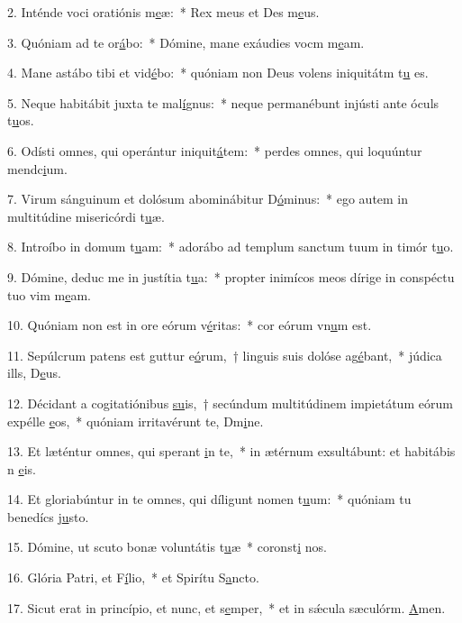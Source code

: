 2. Inténde voci oratiónis m\uline{e}æ:~* Rex meus et Des m\uline{e}us.\par 
3. Quóniam ad te or\uline{á}bo:~* Dómine, mane exáudies vocm m\uline{e}am.\par 
4. Mane astábo tibi et vid\uline{é}bo:~* quóniam non Deus volens iniquitátm t\uline{u} es.\par 
5. Neque habitábit juxta te mal\uline{í}gnus:~* neque permanébunt injústi ante óculs t\uline{u}os.\par 
6. Odísti omnes, qui operántur iniquit\uline{á}tem:~* perdes omnes, qui loquúntur mendc\uline{i}um.\par 
7. Virum sánguinum et dolósum abominábitur D\uline{ó}minus:~* ego autem in multitúdine misericórdi t\uline{u}æ.\par 
8. Introíbo in domum t\uline{u}am:~* adorábo ad templum sanctum tuum in timór t\uline{u}o.\par 
9. Dómine, deduc me in justítia t\uline{u}a:~* propter inimícos meos dírige in conspéctu tuo vim m\uline{e}am.\par 
10. Quóniam non est in ore eórum v\uline{é}ritas:~* cor eórum vn\uline{u}m est.\par 
11. Sepúlcrum patens est guttur e\uline{ó}rum,~† linguis suis dolóse ag\uline{é}bant,~* júdica ills, D\uline{e}us.\par 
12. Décidant a cogitatiónibus \uline{su}is,~† secúndum multitúdinem impietátum eórum expélle \uline{e}os,~* quóniam irritavérunt te, Dm\uline{i}ne.\par 
13. Et læténtur omnes, qui sperant \uline{i}n te,~* in ætérnum exsultábunt: et habitábis n \uline{e}is.\par 
14. Et gloriabúntur in te omnes, qui díligunt nomen t\uline{u}um:~* quóniam tu benedícs j\uline{u}sto.\par 
15. Dómine, ut scuto bonæ voluntátis t\uline{u}æ~* coronst\uline{i} nos.\par 
16. Glória Patri, et F\uline{í}lio,~* et Spirítu S\uline{a}ncto.\par 
17. Sicut erat in princípio, et nunc, et s\uline{e}mper,~* et in sǽcula sæculórm. \uline{A}men.\par 
